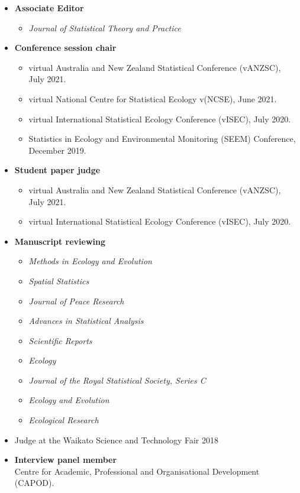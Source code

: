 \documentclass[10pt,a4paper]{moderncv}
\begin{document}
\begin{itemize}
\item \textbf{Associate Editor}
  \begin{itemize}
  \item \textit{Journal of Statistical Theory and Practice}
  \end{itemize}
\item \textbf{Conference session chair}
  \begin{itemize}
  \item virtual Australia and New Zealand Statistical Conference (vANZSC), July 2021.
  \item virtual National Centre for Statistical Ecology v(NCSE), June 2021.
  \item virtual International Statistical Ecology Conference (vISEC), July 2020.
  \item Statistics in Ecology and Environmental Monitoring (SEEM) Conference, December 2019.
  \end{itemize}
\item \textbf{Student paper judge}
  \begin{itemize}
  \item virtual Australia and New Zealand Statistical Conference (vANZSC), July 2021.
  \item virtual International Statistical Ecology Conference (vISEC), July 2020.
  \end{itemize}
\item \textbf{Manuscript reviewing}
  \begin{itemize}
  \item \textit{Methods in Ecology and Evolution}
  \item \textit{Spatial Statistics}
  \item \textit{Journal of Peace Research}
  \item \textit{Advances in Statistical Analysis}
  \item   \textit{Scientific Reports}
  \item \textit{Ecology}
  \item  \textit{Journal of the Royal Statistical Society, Series C}
  \item   \textit{Ecology and Evolution}
  \item   \textit{Ecological Research}
  \end{itemize}
  \item Judge at the Waikato Science and Technology Fair 2018
\item \textbf{Interview panel member}\\
  Centre for Academic, Professional and Organisational Development (CAPOD).
\end{itemize}
\end{document}

